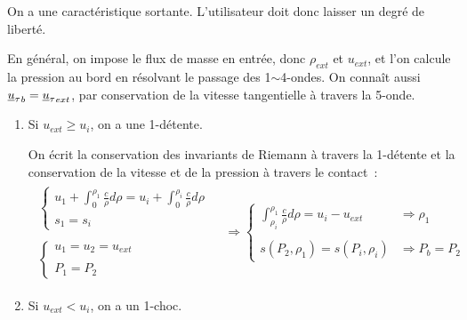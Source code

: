 On a une caractéristique sortante.
L'utilisateur doit donc laisser un degré de liberté.

En général, on impose le flux de masse en entrée, donc $\rho_{ext}$
et $u_{ext}$, et l'on calcule la pression au bord en résolvant
le passage des 1$\sim$4-ondes.
On connaît aussi ${\underline{u}_\tau}_b = {\underline{u}_\tau}_{ext}$,
par conservation de la vitesse tangentielle à travers la 5-onde.

\begin{enumerate}

\item Si $u_{ext} \geqslant u_i$,
on a une 1-détente.

On écrit la conservation
des invariants de Riemann à travers la 1-détente
et la conservation de la vitesse et de la pression à travers le contact~:
\begin{equation}
\begin{array}{lll}
\begin{array}{l}
\left\{\begin{array}{l}
u_1 + \displaystyle\int_0^{\rho_1} \frac{c}{\rho} d\rho
= u_i + \displaystyle\int_0^{\rho_i} \frac{c}{\rho} d\rho\\
\\
s_1 = s_i
\end{array}\right.\\
\\
\left\{\begin{array}{l}
u_1 = u_2 = u_{ext}\\
\\
P_1 = P_2
\end{array}\right.
\end{array}
&
\Rightarrow
\left\{\begin{array}{ll}
\displaystyle\int_{\rho_i}^{\rho_1} \frac{c}{\rho} d\rho
= u_i - u_{ext}
& \Rightarrow \rho_1\\
\\
s(P_2,\rho_1) = s(P_i,\rho_i)
& \Rightarrow P_b = P_2
\end{array}\right.
\end{array}
\end{equation}

\item Si $u_{ext} < u_i$,
on a un 1-choc.


\end{enumerate}
